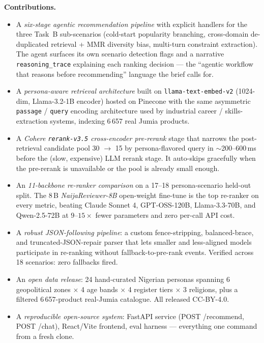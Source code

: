 \documentclass[sigconf,nonacm,balance]{acmart}
\begin{document}
\textbf{Contributions.}
\begin{itemize}[leftmargin=*]
    \item A \emph{six-stage agentic recommendation pipeline} with explicit
          handlers for the three Task~B sub-scenarios (cold-start
          popularity branching, cross-domain de-duplicated retrieval +
          MMR diversity bias, multi-turn constraint extraction). The
          agent surfaces its own scenario detection flags and a
          narrative \texttt{reasoning\_trace} explaining each
          ranking decision --- the ``agentic workflow that reasons
          before recommending'' language the brief calls for.
    \item A \emph{persona-aware retrieval architecture} built on
          \texttt{llama-text-embed-v2} (1024-dim, Llama-3.2-1B encoder)
          hosted on Pinecone with the same asymmetric
          \texttt{passage} / \texttt{query} encoding architecture used
          by industrial career / skills-extraction systems, indexing
          6\,657 real Jumia products.
    \item A \emph{Cohere \texttt{rerank-v3.5} cross-encoder pre-rerank}
          stage that narrows the post-retrieval candidate pool 30 $\to$ 15
          by persona-flavored query in $\sim$200--600\,ms before the
          (slow, expensive) LLM rerank stage. It auto-skips gracefully when
          the pre-rerank is unavailable or the pool is already small enough.
    \item An \emph{11-backbone re-ranker comparison} on a 17--18
          persona-scenario held-out split. The 8\,B \emph{NaijaReviewer-8B}
          open-weight fine-tune is the top re-ranker on every metric,
          beating Claude Sonnet 4, GPT-OSS-120B, Llama-3.3-70B, and
          Qwen-2.5-72B at $9$--$15\times$ fewer parameters and zero
          per-call API cost.
    \item A \emph{robust JSON-following pipeline}: a custom
          fence-stripping, balanced-brace, and truncated-JSON-repair parser
          that lets smaller and
          less-aligned models participate in re-ranking without
          fallback-to-pre-rank events. Verified across 18 scenarios:
          zero fallbacks fired.
    \item An \emph{open data release}: 24 hand-curated Nigerian personas
          spanning 6 geopolitical zones $\times$ 4 age bands $\times$ 4
          register tiers $\times$ 3 religions, plus a filtered
          6\,657-product real-Jumia catalogue. All released CC-BY-4.0.
    \item A \emph{reproducible open-source system}: FastAPI service
          (POST /recommend, POST /chat), React/Vite frontend, eval
          harness --- everything one command from a fresh clone.
\end{itemize}
\end{document}

